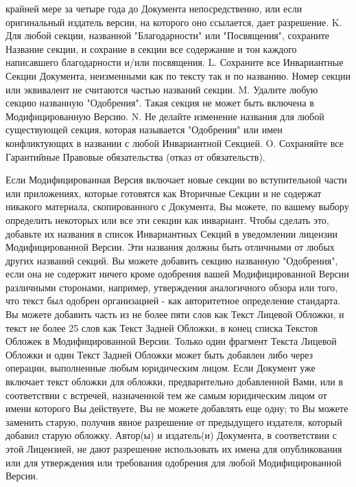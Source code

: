  крайней мере за четыре года до Документа непосредственно, или если оригинальный издатель версии, на которого оно ссылается,
 дает разрешение.
K. Для любой секции, названной "Благодарности" или "Посвящения", сохраните Название секции, и сохрание в секции все
 содержание и тон каждого написавшего благодарности и/или посвящения.
L. Сохраните все Инвариантные Секции Документа, неизменными как по тексту так и по названию. Номер секции или эквивалент
 не считаются частью названий секции.
M. Удалите любую секцию названную "Одобрения". Такая секция не может быть включена в Модифицированную Версию.
N. Не делайте изменение названия для любой существующей секция, которая называется "Одобрения" или имен конфликтующих
 в названии с любой Инвариантной Секцией.
O. Сохраняйте все Гарантийные Правовые обязательства (отказ от обязательств).

Если Модифицированная Версия включает новые секции во вступительной части или приложениях, которые готовятся как Вторичные
 Секции и не содержат никакого материала, скопированного с Документа, Вы можете, по вашему выбору определить некоторых или
 все эти секции как инвариант. Чтобы сделать это, добавьте их названия в список Инвариантных Секций в уведомлении лицензии
 Модифицированной Версии. Эти названия должны быть отличными от любых других названий секций.
Вы можете добавить секцию названную "Одобрения", если она не содержит ничего кроме одобрения вашей Модифицированной Версии
 различными сторонами, например, утверждения аналогичного обзора  или того, что текст был одобрен организацией - как
 авторитетное определение стандарта.
Вы можете добавить часть из не более пяти слов как Текст Лицевой Обложки, и текст не более 25 слов как Текст Задней Обложки,
 в конец списка Текстов Обложек в Модифицированной Версии.
Только один фрагмент Текста Лицевой Обложки и один Текст Задней Обложки может быть добавлен либо через операции,
 выполненные любым юридическим лицом. Если Документ уже включает текст обложки для обложки, предварительно добавленной
 Вами, или в соответствии с встречей, назначенной тем же самым юридическим лицом от имени которого Вы действуете, Вы не
 можете добавлять еще одну; то Вы можете заменить старую, получив явное разрешение от предыдущего издателя, который добавил
 старую обложку.
Автор(ы) и издатель(и) Документа, в соответствии с этой Лицензией, не дают разрешение использовать их имена для опубликования
 или для утверждения или требования одобрения для любой Модифицированной Версии.

